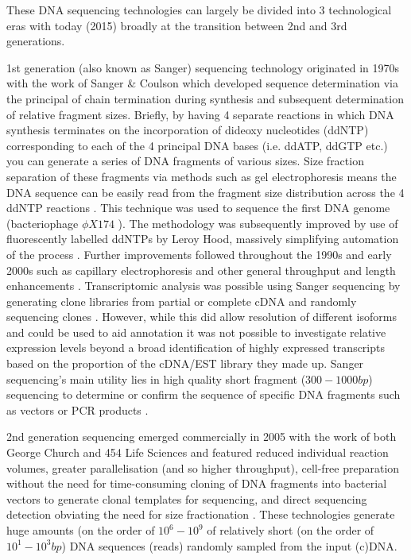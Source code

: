 

These DNA sequencing technologies can largely be divided into 3 technological eras with today (2015) 
broadly at the transition between 2nd and 3rd generations.


1st generation (also known as Sanger) sequencing technology originated in 1970s with the work of Sanger \&
Coulson \citep{Sanger1975,Sanger1977,Sanger1977a} which 
developed sequence determination via the principal of chain termination during 
synthesis and subsequent determination of relative fragment sizes. 
Briefly, by having 4 separate reactions in which DNA synthesis terminates on the incorporation
of dideoxy nucleotides (ddNTP) corresponding to each of the 4 principal DNA bases (i.e. ddATP, ddGTP etc.) 
you can generate a series of DNA fragments of various sizes.  Size fraction separation of these fragments 
via methods such as gel electrophoresis means the DNA sequence can be easily read from the fragment size distribution
across the 4 ddNTP reactions \citep{Sanger1977a}. 
This technique was used to sequence the first DNA genome (bacteriophage \(\phi X174\) \citep{Sanger1977}).
The methodology was subsequently improved by use of fluorescently labelled ddNTPs by Leroy Hood,
massively simplifying automation of the process \citep{Smith1985,Smith1986}.
Further improvements followed throughout the 1990s and early 2000s such as capillary electrophoresis
and other general throughput and length enhancements \citep{Bonetta2006}.
Transcriptomic analysis was possible using Sanger sequencing by generating clone libraries from partial or complete cDNA and randomly sequencing
clones \citep{Adams1991,Gerhard2004}.  However, while this did allow resolution of different isoforms and could be used to aid annotation \citep{Adams1991}
it was not possible to investigate relative expression levels beyond a broad identification of highly expressed transcripts based on the 
proportion of the cDNA/EST library they made up.
Sanger sequencing's main utility lies in high quality short fragment (\(300-1000bp\)) sequencing to determine or confirm the sequence 
of specific DNA fragments such as vectors or PCR products \citep{Bonetta2006,Tsiatis2010}.  


2nd generation sequencing emerged commercially in 2005 with the work
of both George Church and 454 Life Sciences \citep{Margulies2005} and featured
reduced individual reaction volumes, greater parallelisation (and so higher throughput),
cell-free preparation without the need for time-consuming cloning of DNA fragments into bacterial vectors to generate
clonal templates for sequencing, and direct sequencing detection obviating the need
for size fractionation \citep{Jaszczyszyn2014}.
These technologies generate huge amounts (on the order of \(10^{6}-10^{9}\) of relatively short (on the order of \(10^{1}-10^{3}bp\)) DNA sequences 
    (reads) randomly sampled from the input (c)DNA. 


